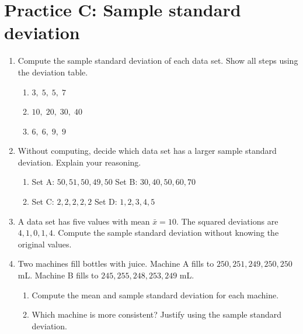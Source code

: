 \section*{Practice C: Sample standard deviation}
\begin{enumerate}[label=C\arabic*.,leftmargin=2.5em,itemsep=10pt]
  \item Compute the sample standard deviation of each data set.
    Show all steps using the deviation table.
    \begin{enumerate}[label=(\alph*), itemsep=6pt]
      \item $3,\; 5,\; 5,\; 7$
      \item $10,\; 20,\; 30,\; 40$
      \item $6,\; 6,\; 9,\; 9$
    \end{enumerate}

  \item Without computing, decide which data set has a
    larger sample standard deviation. Explain your reasoning.
    \begin{enumerate}[label=(\alph*), itemsep=4pt]
      \item Set A: $50, 51, 50, 49, 50$ \quad
        Set B: $30, 40, 50, 60, 70$
      \item Set C: $2, 2, 2, 2, 2$ \quad
        Set D: $1, 2, 3, 4, 5$
    \end{enumerate}

  \item A data set has five values with mean $\bar{x} = 10$.
    The squared deviations are $4, 1, 0, 1, 4$.
    Compute the sample standard deviation without knowing the
    original values.

  \item Two machines fill bottles with juice.
    Machine A fills to $250, 251, 249, 250, 250$ mL.
    Machine B fills to $245, 255, 248, 253, 249$ mL.
    \begin{enumerate}[label=(\alph*), itemsep=4pt]
      \item Compute the mean and sample standard deviation for
        each machine.
      \item Which machine is more consistent?
        Justify using the sample standard deviation.
    \end{enumerate}

\end{enumerate}

\clearpage
